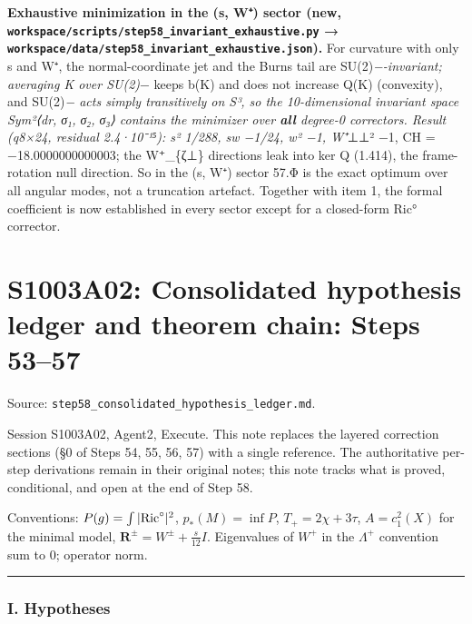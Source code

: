\documentclass[
  10pt,
]{report}
\begin{document}
\textbf{Exhaustive minimization in the (s, W⁺) sector (new,
\texttt{workspace/scripts/step58\_invariant\_exhaustive.py} →
\texttt{workspace/data/step58\_invariant\_exhaustive.json}).} For
curvature with only s and W⁺, the normal-coordinate jet and the Burns
tail are SU(2)\emph{−-invariant; averaging K over SU(2)}− keeps b(K) and
does not increase Q(K) (convexity), and SU(2)\emph{− acts simply
transitively on S³, so the 10-dimensional invariant space Sym²⟨dr, σ₁,
σ₂, σ₃⟩ contains the minimizer over \textbf{all} degree-0 correctors.
Result (q8×24, residual 2.4·10⁻¹⁵): s² 1/288, sw −1/24, w² −1,
\textbar W⁺}⊥⊥\textbar² −1, CH = −18.0000000000003; the W⁺\_\{ζ⊥\}
directions leak into ker Q (1.414), the frame-rotation null direction.
So in the (s, W⁺) sector 57.Φ is the exact optimum over all angular
modes, not a truncation artefact. Together with item 1, the formal
coefficient is now established in every sector except for a closed-form
Ric° corrector.

\hypertarget{s1003a02-consolidated-hypothesis-ledger-and-theorem-chain-steps-5357}{%
\chapter{S1003A02: Consolidated hypothesis ledger and theorem chain:
Steps
53--57}\label{s1003a02-consolidated-hypothesis-ledger-and-theorem-chain-steps-5357}}

Source: \texttt{step58\_consolidated\_hypothesis\_ledger.md}.

Session S1003A02, Agent2, Execute. This note replaces the layered
correction sections (§0 of Steps 54, 55, 56, 57) with a single
reference. The authoritative per-step derivations remain in their
original notes; this note tracks what is proved, conditional, and open
at the end of Step 58.

Conventions: \(P(g)=\int|{\rm Ric}^\circ|^2\), \(p_*(M)=\inf P\),
\(T_+=2\chi+3\tau\), \(A=c_1^2(X)\) for the minimal model,
\(\mathbf R^\pm=W^\pm+\frac s{12}I\). Eigenvalues of \(W^+\) in the
\(\Lambda^+\) convention sum to 0; operator norm.

\begin{center}\rule{0.5\linewidth}{0.5pt}\end{center}

\hypertarget{i.-hypotheses}{%
\subsection{I. Hypotheses}\label{i.-hypotheses}}
\end{document}
